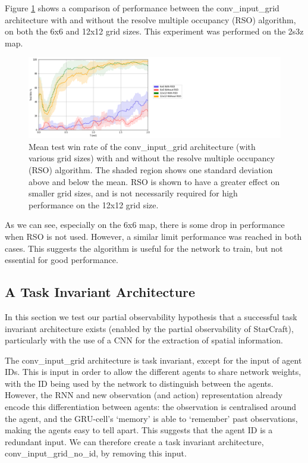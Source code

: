 Figure \ref{fig:multocc} shows a comparison of performance between the conv\_input\_grid architecture with and without the resolve multiple occupancy (RSO) algorithm, on both the 6x6 and 12x12 grid sizes. This experiment was performed on the 2s3z map.

\begin{figure}
    \centering
    \hbox{\hspace{5em}\includegraphics[scale=0.5]{images/graphs/mult_occ.png}}
    \caption{Mean test win rate of the conv\_input\_grid architecture (with various grid sizes) with and without the resolve multiple occupancy (RSO) algorithm. The shaded region shows one standard deviation above and below the mean. RSO is shown to have a greater effect on smaller grid sizes, and is not necessarily required for high performance on the 12x12 grid size.}
    \label{fig:multocc}
\end{figure}

As we can see, especially on the 6x6 map, there is some drop in performance when RSO is not used. However, a similar limit performance was reached in both cases. This suggests the algorithm is useful for the network to train, but not essential for good performance. 


\subsection{A Task Invariant Architecture}
In this section we test our partial observability hypothesis that a successful task invariant architecture exists (enabled by the partial observability of StarCraft), particularly with the use of a CNN for the extraction of spatial information.

The conv\_input\_grid architecture is task invariant, except for the input of agent IDs. This is input in order to allow the different agents to share network weights, with the ID being used by the network to distinguish between the agents. However, the RNN and new observation (and action) representation already encode this differentiation between agents: the observation is centralised around the agent, and the GRU-cell's `memory' is able to `remember' past observations, making the agents easy to tell apart. This suggests that the agent ID is a redundant input. We can therefore create a task invariant architecture, conv\_input\_grid\_no\_id, by removing this input.


